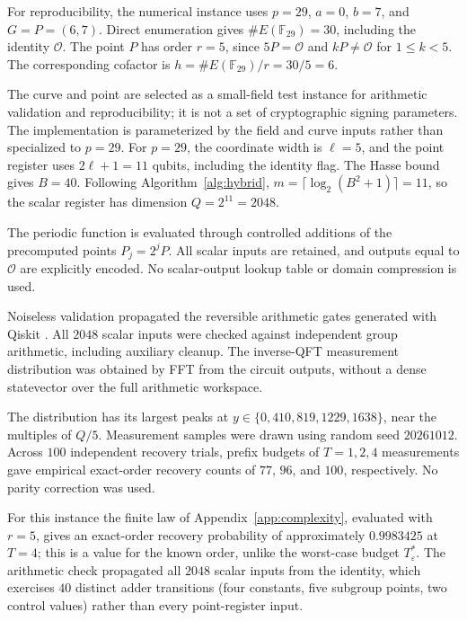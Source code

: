 \begin{revision}
For reproducibility, the numerical instance uses $p=29$, $a=0$, $b=7$, and $G=P=(6,7)$. Direct enumeration gives $\#E(\mathbb{F}_{29})=30$, including the identity $\mathcal{O}$. The point $P$ has order $r=5$, since $5P=\mathcal{O}$ and $kP\neq\mathcal{O}$ for $1\leq k<5$. The corresponding cofactor is $h=\#E(\mathbb{F}_{29})/r=30/5=6$. 

The curve and point are selected as a small-field test instance for arithmetic validation and reproducibility; it is not a set of cryptographic signing parameters. The implementation is parameterized by the field and curve inputs rather than specialized to $p=29$. For $p=29$, the coordinate width is $\ell=5$, and the point register uses $2\ell+1=11$ qubits, including the identity flag. The Hasse bound gives $B=40$. Following Algorithm~\ref{alg:hybrid}, $m=\lceil\log_2(B^2+1)\rceil=11$, so the scalar register has dimension $Q=2^{11}=2048$.

The periodic function is evaluated through controlled additions of the precomputed points $P_j=2^jP$. All scalar inputs are retained, and outputs equal to $\mathcal O$ are explicitly encoded. No scalar-output lookup table or domain compression is used.

Noiseless validation propagated the reversible arithmetic gates generated with Qiskit \cite{Qiskit2023}. All $2048$ scalar inputs were checked against independent group arithmetic, including auxiliary cleanup. The inverse-QFT measurement distribution was obtained by FFT from the circuit outputs, without a dense statevector over the full arithmetic workspace. 

The distribution has its largest peaks at $y\in\{0,410,819,1229,1638\}$, near the multiples of $Q/5$. Measurement samples were drawn using random seed $20261012$. Across $100$ independent recovery trials, prefix budgets of $T=1,2,4$ measurements gave empirical exact-order recovery counts of $77$, $96$, and $100$, respectively. No parity correction was used.

For this instance the finite law of Appendix~\ref{app:complexity}, evaluated with $r=5$, gives an exact-order recovery probability of approximately $0.9983425$ at $T=4$; this is a value for the known order, unlike the worst-case budget $T_\varepsilon^*$. The arithmetic check propagated all $2048$ scalar inputs from the identity, which exercises $40$ distinct adder transitions (four constants, five subgroup points, two control values) rather than every point-register input.


\end{revision}
